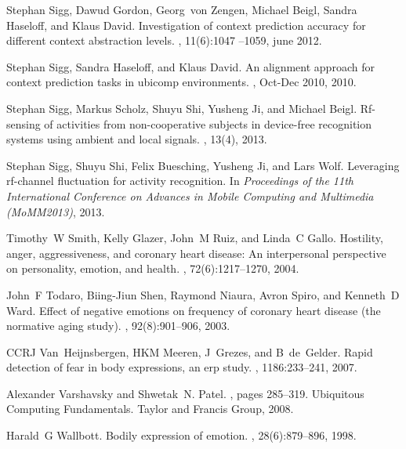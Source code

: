 \documentclass[12pt]{article}
\begin{document}
\begin{small}
\begin{thebibliography}{10}
Stephan Sigg, Dawud Gordon, Georg~von Zengen, Michael Beigl, Sandra Haseloff,
  and Klaus David.
\newblock Investigation of context prediction accuracy for different context
  abstraction levels.
, 11(6):1047 --1059, june
  2012.

Stephan Sigg, Sandra Haseloff, and Klaus David.
\newblock An alignment approach for context prediction tasks in ubicomp
  environments.
, Oct-Dec 2010, 2010.

Stephan Sigg, Markus Scholz, Shuyu Shi, Yusheng Ji, and Michael Beigl.
\newblock Rf-sensing of activities from non-cooperative subjects in device-free
  recognition systems using ambient and local signals.
, 13(4), 2013.

Stephan Sigg, Shuyu Shi, Felix Buesching, Yusheng Ji, and Lars Wolf.
\newblock Leveraging rf-channel fluctuation for activity recognition.
\newblock In {\em Proceedings of the 11th International Conference on Advances
  in Mobile Computing and Multimedia (MoMM2013)}, 2013.

Timothy~W Smith, Kelly Glazer, John~M Ruiz, and Linda~C Gallo.
\newblock Hostility, anger, aggressiveness, and coronary heart disease: An
  interpersonal perspective on personality, emotion, and health.
, 72(6):1217--1270, 2004.

John~F Todaro, Biing-Jiun Shen, Raymond Niaura, Avron Spiro, and Kenneth~D
  Ward.
\newblock Effect of negative emotions on frequency of coronary heart disease
  (the normative aging study).
, 92(8):901--906, 2003.

CCRJ Van~Heijnsbergen, HKM Meeren, J~Grezes, and B~de~Gelder.
\newblock Rapid detection of fear in body expressions, an erp study.
, 1186:233--241, 2007.

Alexander Varshavsky and Shwetak~N. Patel.
, pages 285--319.
\newblock Ubiquitous Computing Fundamentals. Taylor and Francis Group, 2008.

Harald~G Wallbott.
\newblock Bodily expression of emotion.
, 28(6):879--896, 1998.


\end{thebibliography}
\end{small}
\end{document}
